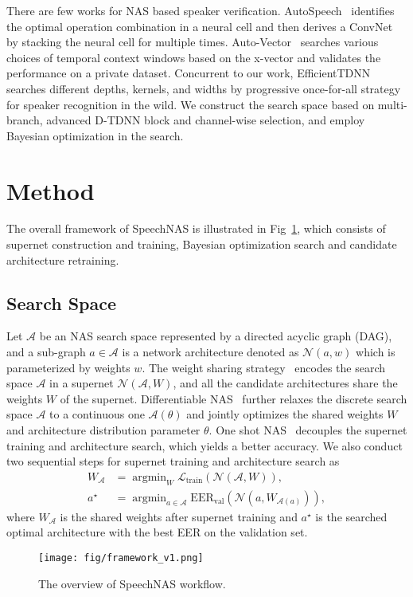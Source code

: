 \documentclass{article}
\DeclareMathOperator*{\argmin}{argmin}
\begin{document}
There are few works for NAS based speaker verification. AutoSpeech~\cite{ding2020autospeech} identifies the optimal operation combination in a neural cell and then derives a ConvNet by stacking the neural cell for multiple times. Auto-Vector~\cite{qu2020evolutionary} searches various choices of temporal context windows based on the x-vector and validates the performance on a private dataset. Concurrent to our work, EfficientTDNN~\cite{wang2021efficienttdnn} searches different depths, kernels, and widths by progressive once-for-all strategy~\cite{cai2019once} for speaker recognition in the wild. We construct the search space based on multi-branch, advanced D-TDNN block and channel-wise selection, and employ Bayesian optimization in the search.  \section{Method}\label{sec:method}
The overall framework of SpeechNAS is illustrated in Fig~\ref{fig:framework}, which consists of supernet construction and training, Bayesian optimization search and candidate architecture retraining.

\subsection{Search Space}\label{sec:search_space}
Let $\mathcal{A}$ be an NAS search space represented by a directed acyclic graph (DAG), and a sub-graph $a \in \mathcal{A}$ is a network architecture denoted as $\mathcal{N}(a, w)$ which is parameterized by weights $w$. The weight sharing strategy~\cite{guo2020single} encodes the search space $\mathcal{A}$ in a supernet $\mathcal{N}(\mathcal{A}, W)$, and all the candidate architectures share the weights $W$ of the supernet. Differentiable NAS~\cite{liu2018darts} further relaxes the discrete search space $\mathcal{A}$ to a continuous one $\mathcal{A}(\theta)$ and jointly optimizes the shared weights $W$ and architecture distribution parameter $\theta$. One shot NAS~\cite{guo2020single} decouples the supernet training and architecture search, which yields a better accuracy. We also conduct two sequential steps for supernet training and architecture search as
\begin{equation}
\begin{aligned}
    W_{\mathcal{A}} &= {\argmin}_{W} \mathcal{L}_{\text{train}}(\mathcal{N}(\mathcal{A}, W)), \\
    a^{\star} &= {\argmin}_{a \in \mathcal{A}} \text{EER}_{\text{val}}(\mathcal{N}(a, W_{\mathcal{A}(a)})),
\end{aligned}
\end{equation}
where $W_{\mathcal{A}}$ is the shared weights after supernet training and $a^{\star}$ is the searched optimal architecture with the best EER on the validation set.
\begin{figure}[t]
\begin{minipage}[b]{1.0\linewidth}
  \centering
  \centerline{\texttt{[image: fig/framework\_v1.png]}}
\end{minipage}
\caption{The overview of SpeechNAS workflow.}
\label{fig:framework}
\end{figure}
\end{document}

